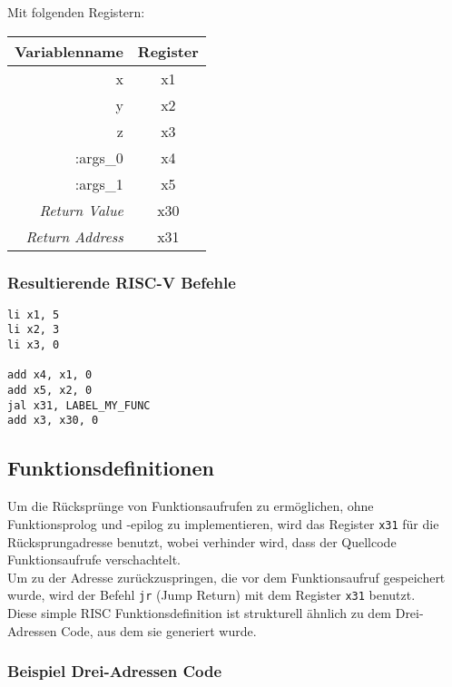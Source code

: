 Mit folgenden Registern:

\begin{table}[H]
  \begin{center}
    \begin{tabular}{| r | c |}
      \hline
      Variablenname & Register \\
      \hline
      x & x1 \\
      y & x2 \\
      z & x3 \\
      :args\_0 & x4 \\
      :args\_1 & x5 \\
      \textit{Return Value} & x30 \\
      \textit{Return Address} & x31 \\
      \hline
    \end{tabular}
  \end{center}
\end{table}

\subsubsection{Resultierende RISC-V Befehle}

\begin{lstlisting}
li x1, 5
li x2, 3
li x3, 0

add x4, x1, 0
add x5, x2, 0
jal x31, LABEL_MY_FUNC
add x3, x30, 0

\end{lstlisting}

\pagebreak

\subsection{Funktionsdefinitionen}

Um die Rücksprünge von Funktionsaufrufen zu ermöglichen, ohne Funktionsprolog und -epilog zu implementieren, wird das Register \texttt{x31} für die Rücksprungadresse benutzt, wobei verhinder wird, dass der Quellcode Funktionsaufrufe verschachtelt.\\
Um zu der Adresse zurückzuspringen, die vor dem Funktionsaufruf gespeichert wurde, wird der Befehl \texttt{jr} (Jump Return) mit dem Register \texttt{x31} benutzt\cite{waterman:2017}.\\
Diese simple RISC Funktionsdefinition ist strukturell ähnlich zu dem Drei-Adressen Code, aus dem sie generiert wurde.

\subsubsection{Beispiel Drei-Adressen Code}

